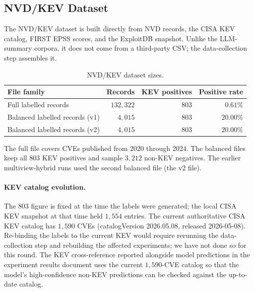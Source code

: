 \documentclass[11pt]{article}
\begin{document}
\subsection{NVD/KEV Dataset}

The NVD/KEV dataset is built directly from NVD records, the CISA KEV
catalog, FIRST EPSS scores, and the ExploitDB snapshot. Unlike the
LLM-summary corpora, it does not come from a third-party CSV; the
data-collection step assembles it.

\begin{table}[h]
\centering
\small
\begin{tabular}{lrrr}
\toprule
File family & Records & KEV positives & Positive rate \\
\midrule
Full labelled records & $132{,}322$ & $803$ & $0.61\%$ \\
Balanced labelled records (v1) & $4{,}015$ & $803$ & $20.00\%$ \\
Balanced labelled records (v2) & $4{,}015$ & $803$ & $20.00\%$ \\
\bottomrule
\end{tabular}
\caption{NVD/KEV dataset sizes.}
\end{table}

The full file covers CVEs published from $2020$ through $2024$. The
balanced files keep all $803$ KEV positives and sample $3{,}212$
non-KEV negatives. The earlier multiview-hybrid runs used the second
balanced file (the v2 file).

\paragraph{KEV catalog evolution.}
The $803$ figure is fixed at the time the labels were generated; the
local CISA KEV snapshot at that time held $1{,}554$ entries. The
current authoritative CISA KEV catalog has $1{,}590$ CVEs
(catalogVersion 2026.05.08, released 2026-05-08). Re-binding the
labels to the current KEV would require rerunning the data-collection
step and rebuilding the affected experiments; we have not done so for
this round. The KEV cross-reference reported alongside model
predictions in the experiment results document uses the current
$1{,}590$-CVE catalog so that the model's high-confidence non-KEV
predictions can be checked against the up-to-date catalog.
\end{document}
